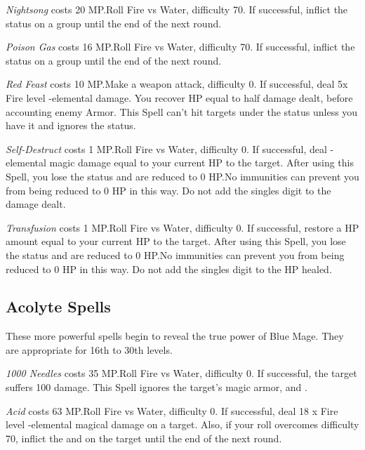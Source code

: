 \begin{multicols}{2}
    \textit{Nightsong} costs 20 MP.\@{}Roll Fire vs Water, difficulty 70. If successful, inflict the  status on a group until the end of the next round.
    
    \textit{Poison Gas} costs 16 MP.\@{}Roll Fire vs Water, difficulty 70. If successful, inflict the  status on a group until the end of the next round.
    
    \textit{Red Feast} costs 10 MP.\@{}Make a weapon attack, difficulty 0. If successful, deal 5x Fire level -elemental damage. You recover HP equal to half damage dealt, before accounting enemy Armor. This Spell can’t hit targets under the  status unless you have it and ignores the  status.
    
    \textit{Self-Destruct} costs 1 MP.\@{}Roll Fire vs Water, difficulty 0. If successful, deal -elemental magic damage equal to your current HP to the target. After using this Spell, you lose the  status and are reduced to 0 HP.\@{}No immunities can prevent you from being reduced to 0 HP in this way. Do not add the singles digit to the damage dealt.

    \textit{Transfusion} costs 1 MP.\@{}Roll Fire vs Water, difficulty 0. If successful, restore a HP amount equal to your current HP to the target. After using this Spell, you lose the  status and are reduced to 0 HP.\@{}No immunities can prevent you from being reduced to 0 HP in this way. Do not add the singles digit to the HP healed.
    
\subsection{Acolyte Spells}\label{subsec:blue-acolyte}

These more powerful spells begin to reveal the true power of Blue Mage. They are appropriate for 16th to 30th levels.

    \textit{1000 Needles} costs 35 MP.\@{}Roll Fire vs Water, difficulty 0. If successful, the target suffers 100 damage. This Spell ignores the target’s magic armor,  and .

    \textit{Acid} costs 63 MP.\@{}Roll Fire vs Water, difficulty 0. If successful, deal 18 x Fire level -elemental magical damage on a target. Also, if your roll overcomes difficulty 70, inflict the  and  on the target until the end of the next round.
    

\end{multicols}
